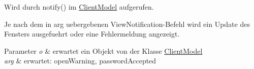 Wird durch notify() im \hyperlink{a00003}{Client\-Model} aufgerufen. 

Je nach dem in arg uebergebenen View\-Notification-\/\-Befehl wird ein Update des Fensters ausgefuehrt oder eine Fehlermeldung angezeigt.


\begin{DoxyParams}{Parameter}
{\em o} & erwartet ein Objekt von der Klasse \hyperlink{a00003}{Client\-Model} \\
\hline
{\em arg} & erwartet\-: open\-Warning, password\-Accepted \\
\hline
\end{DoxyParams}
